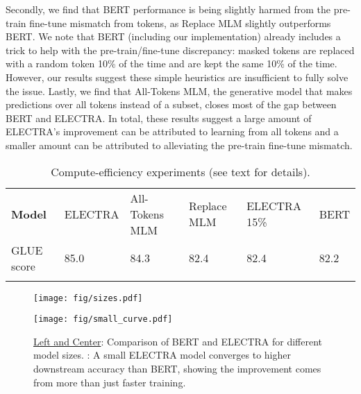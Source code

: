 \documentclass{article}
\newcommand\tstrut{\rule{0pt}{2.6ex}}
\newcommand\bstrut{\rule[-1.0ex]{0pt}{0pt}}
\newcommand{\thinline}{\Xhline{1.5\arrayrulewidth}}
\newcommand{\thickline}{\Xhline{2.5\arrayrulewidth}}
\newcommand{\tsep}	{\bstrut \\ \thinline}
\newcommand{\ttop}{\thickline}
\newcommand{\tbottom}{\bstrut \\ \thickline}
\begin{document}
Secondly, we find that BERT performance is being slightly harmed from the pre-train fine-tune mismatch from  tokens, as Replace MLM slightly outperforms BERT. 
We note that BERT (including our implementation) already includes a trick to help with the pre-train/fine-tune discrepancy: masked tokens are replaced with a random token 10\% of the time and are kept the same 10\% of the time. However, our results suggest these simple heuristics are insufficient to fully solve the issue. 
Lastly, we find that All-Tokens MLM, the generative model that makes predictions over all tokens instead of a subset, closes most of the gap between BERT and ELECTRA.
In total, these results suggest a large amount of ELECTRA's improvement can be attributed to learning from all tokens and a smaller amount can be attributed to alleviating the pre-train fine-tune mismatch. 
\addtolength{\tabcolsep}{0pt}
\begin{table*}[t!]
\small
\begin{center}
\begin{tabularx}{\linewidth}{X l l l l l}
\ttop
 \textbf{Model} & ELECTRA & All-Tokens MLM & Replace MLM & ELECTRA 15\% & BERT \tstrut \tsep
 GLUE score & 85.0 & 84.3 & 82.4 & 82.4 & 82.2 \tstrut \tbottom
\end{tabularx} 
\end{center}
\vspace{-2mm}
\caption{Compute-efficiency experiments (see text for details).}
\vspace{-1mm}
\label{tab:sample}
\end{table*}
\addtolength{\tabcolsep}{0pt}


\begin{figure}[tb]
\begin{center}
\begin{minipage}[c]{0.61\textwidth}
\texttt{[image: fig/sizes.pdf]}
\end{minipage}
\hspace{6mm}
\begin{minipage}[c]{0.26\textwidth}
\vspace{2mm}
\texttt{[image: fig/small\_curve.pdf]}
\end{minipage}
\end{center}
\caption{\underline{Left and Center}: Comparison of BERT and ELECTRA for different model sizes. \underline{}: A small ELECTRA model converges to higher downstream accuracy than BERT, showing the improvement comes from more than just faster training.}
\label{fig:param}
\end{figure}
\end{document}
